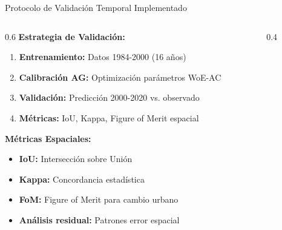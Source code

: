 \documentclass[aspectratio=169]{beamer}
\begin{document}
\begin{frame}{Protocolo de Validación Temporal Implementado}
  \begin{columns}
    \begin{column}{0.6\textwidth}
      \textbf{Estrategia de Validación:}
      \begin{enumerate}
        \item \textbf{Entrenamiento:} Datos 1984-2000 (16 años)
        \item \textbf{Calibración AG:} Optimización parámetros WoE-AC  
        \item \textbf{Validación:} Predicción 2000-2020 vs. observado
        \item \textbf{Métricas:} IoU, Kappa, Figure of Merit espacial
      \end{enumerate}
      
      \vspace{0.3cm}
      \textbf{Métricas Espaciales:}
      \begin{itemize}
        \item \textbf{IoU:} Intersección sobre Unión
        \item \textbf{Kappa:} Concordancia estadística  
        \item \textbf{FoM:} Figure of Merit para cambio urbano
        \item \textbf{Análisis residual:} Patrones error espacial
      \end{itemize}
    \end{column}
    \begin{column}{0.4\textwidth}
      \begin{center}
      \end{center}
      

\end{column}
\end{columns}
\end{frame}
\end{document}
